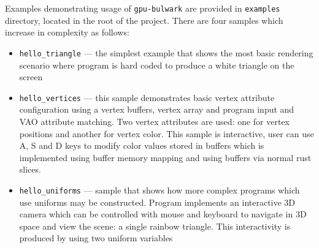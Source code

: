 Examples demonstrating usage of \texttt{gpu-bulwark} are provided in \texttt{examples} directory, located in the root of the project.
There are four samples which increase in complexity as follows:
\begin{itemize}
    \item \texttt{hello\_triangle} --- the simplest example that shows the most basic rendering scenario where program is hard coded to produce a white
        triangle on the screen
    \item \texttt{hello\_vertices} --- this sample demonstrates basic vertex attribute configuration using a vertex buffers, 
        vertex array and program input and VAO attribute matching. 
        Two vertex attributes are used: one for vertex positions and another for vertex color.
        This sample is interactive, user can use A, S and D keys to modify color values stored in buffers 
        which is implemented using buffer memory mapping and using buffers via normal rust slices.
    \item \texttt{hello\_uniforms} --- sample that shows how more complex programs which use uniforms may be constructed.
        Program implements an interactive 3D camera which can be controlled with mouse and keyboard to navigate in 3D space and
        view the scene: a single rainbow triangle. This interactivity is produced by using two uniform variables 
\end{itemize}
